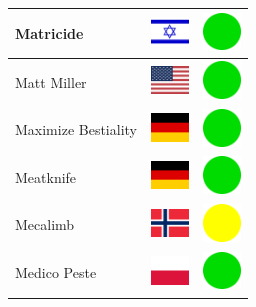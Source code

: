 \documentclass[12pt, a4paper, twoside]{report}
\begin{document}
\begin{center}
\begin{longtable}{|p{5cm}|p{2cm}|p{2cm}|}
 Matricide                                                  & \includegraphics[width=1cm]{../4x3/il} &   \includegraphics[width=1cm]{../likes/y} \\ \hline
 Matt Miller                                                & \includegraphics[width=1cm]{../4x3/us} &   \includegraphics[width=1cm]{../likes/y} \\ \hline
 Maximize Bestiality                                        & \includegraphics[width=1cm]{../4x3/de} &   \includegraphics[width=1cm]{../likes/y} \\ \hline
 Meatknife                                                  & \includegraphics[width=1cm]{../4x3/de} &   \includegraphics[width=1cm]{../likes/y} \\ \hline
 Mecalimb                                                   & \includegraphics[width=1cm]{../4x3/no} &   \includegraphics[width=1cm]{../likes/m} \\ \hline
 Medico Peste                                               & \includegraphics[width=1cm]{../4x3/pl} &   \includegraphics[width=1cm]{../likes/y} \\ \hline

\end{longtable}
\end{center}
\end{document}
